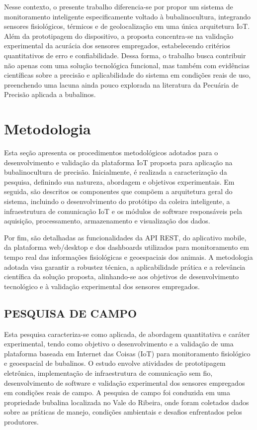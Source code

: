 \documentclass[11pt,a4paper]{article}
\begin{document}
Nesse contexto, o presente trabalho diferencia-se por propor um sistema de monitoramento
inteligente especificamente voltado à bubalinocultura, integrando sensores fisiológicos, térmicos
e de geolocalização em uma única arquitetura IoT. Além da prototipagem do dispositivo, a
proposta concentra-se na validação experimental da acurácia dos sensores empregados, estabelecendo critérios quantitativos de erro e confiabilidade. Dessa forma, o trabalho busca contribuir
não apenas com uma solução tecnológica funcional, mas também com evidências científicas sobre
a precisão e aplicabilidade do sistema em condições reais de uso, preenchendo uma lacuna ainda
pouco explorada na literatura da Pecuária de Precisão aplicada a bubalinos.

\section{Metodologia}

Esta seção apresenta os procedimentos metodológicos adotados para o desenvolvimento e validação da plataforma IoT proposta para aplicação na bubalinocultura de precisão. Inicialmente,
é realizada a caracterização da pesquisa, definindo sua natureza, abordagem e objetivos experimentais. Em seguida, são descritos os componentes que compõem a arquitetura geral do sistema,
incluindo o desenvolvimento do protótipo da coleira inteligente, a infraestrutura de comunicação IoT e os módulos de software responsáveis pela aquisição, processamento, armazenamento
e visualização dos dados.

Por fim, são detalhadas as funcionalidades da API REST, do aplicativo mobile, da plataforma
web/desktop e dos dashboards utilizados para monitoramento em tempo real das informações
fisiológicas e geoespaciais dos animais. A metodologia adotada visa garantir a robustez técnica,
a aplicabilidade prática e a relevância científica da solução proposta, alinhando-se aos objetivos
de desenvolvimento tecnológico e à validação experimental dos sensores empregados.


\subsection{PESQUISA DE CAMPO}

Esta pesquisa caracteriza-se como aplicada, de abordagem quantitativa e caráter experimental,
tendo como objetivo o desenvolvimento e a validação de uma plataforma baseada em Internet
das Coisas (IoT) para monitoramento fisiológico e geoespacial de bubalinos. O estudo envolve
atividades de prototipagem eletrônica, implementação de infraestrutura de comunicação sem fio,
desenvolvimento de software e validação experimental dos sensores empregados em condições
reais de campo. A pesquisa de campo foi conduzida em uma propriedade bubalina localizada no
Vale do Ribeira, onde foram coletados dados sobre as práticas de manejo, condições ambientais
e desafios enfrentados pelos produtores.
\end{document}
